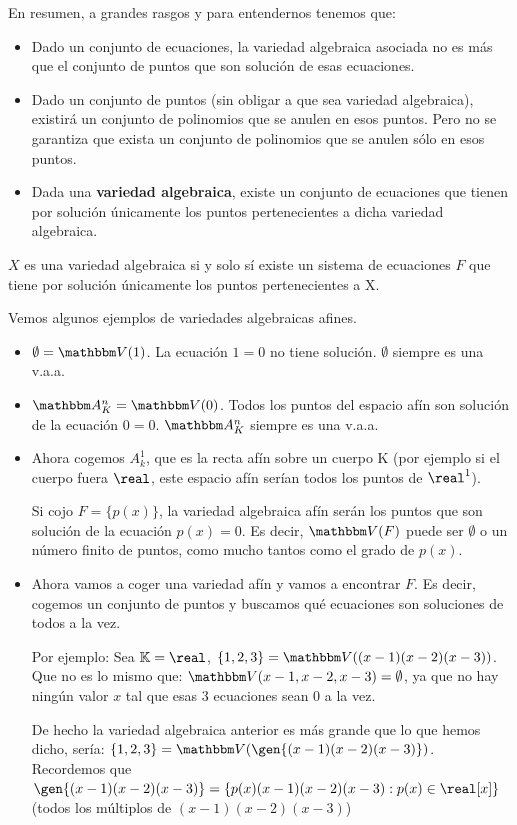 En resumen, a grandes rasgos y para entendernos tenemos que:
\begin{itemize}
	\item Dado un conjunto de ecuaciones, la variedad algebraica asociada no es más que el conjunto de puntos que son solución de esas ecuaciones.
	\item Dado un conjunto de puntos (sin obligar a que sea variedad algebraica), existirá un conjunto de polinomios que se anulen en esos puntos. Pero no se garantiza que exista un conjunto de polinomios que se anulen sólo en esos puntos.
	\item Dada una \textbf{variedad algebraica}, existe un conjunto de ecuaciones que tienen por solución únicamente los puntos pertenecientes a dicha variedad algebraica.
\end{itemize}

\obs $X$ es una variedad algebraica si y solo sí existe un sistema de ecuaciones $F$ que tiene por solución únicamente los puntos pertenecientes a X.

Vemos algunos ejemplos de variedades algebraicas afines.
\begin{example}
	\begin{itemize}
		\item $\emptyset = \V(1)$. La ecuación $1=0$ no tiene solución. $\emptyset$ siempre es una v.a.a.
		\item $\A_K^n=\V(0)$. Todos los puntos del espacio afín son solución de la ecuación $0=0$. $\A_K^n$ siempre es una v.a.a.
		\item Ahora cogemos $A^1_k$, que es la recta afín sobre un cuerpo K (por ejemplo si el cuerpo fuera $\real$, este espacio afín serían todos los puntos de $\real^1$).
		
		Si cojo $F=\{p(x)\}$, la variedad algebraica afín serán los puntos que son solución de la ecuación $p(x)=0$. Es decir, $\V(F)$ puede ser $\emptyset$ o un número finito de puntos, como mucho tantos como el grado de $p(x)$.
		\item Ahora vamos a coger una variedad afín y vamos a encontrar $F$. Es decir, cogemos un conjunto de puntos y buscamos qué ecuaciones son soluciones de todos a la vez.
		
		Por ejemplo: Sea $\K=\real$, $\{1,2,3\} =\V((x-1)(x-2)(x-3))$. Que no es lo mismo que: $\V(x-1,x-2,x-3)=\emptyset$, ya que no hay ningún valor $x$ tal que esas 3 ecuaciones sean 0 a la vez. 
		
		De hecho la variedad algebraica anterior es más grande que lo que hemos dicho, sería: $\{1,2,3\} =\V(\gen{(x-1)(x-2)(x-3)})$. Recordemos que $\gen{(x-1)(x-2)(x-3)} = \{ p(x)(x-1)(x-2)(x-3) : p(x) \in \real[x] \}$ (todos los múltiplos de $(x-1)(x-2)(x-3)$)
	\end{itemize}
\end{example}

